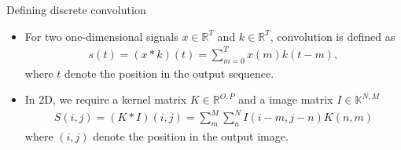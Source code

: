 \documentclass{beamer}
\begin{document}
		
		 \begin{frame}{Defining discrete convolution}
		\begin{itemize}
			\item For two one-dimensional signals $x \in \mathbb{R}^T$
        and $k \in \mathbb{R}^T$, convolution is defined as
        \begin{align}
            s(t) = (x * k)(t) = \sum_{m=0}^{T} x(m)k(t - m),
        \end{align}
				where $t$ denote the position in the output sequence. %
        \item In 2D, we require a kernel matrix $K \in \mathbb{R}^{O,P}$ and a image matrix
        $I \in \mathbb{K}^{N,M}$
        \begin{align}
            S(i,j) = (K * I)(i,j) = \sum_m^M \sum_n^N I(i-m, j-n)K(n,m)
        \end{align}
				where $(i,j)$ denote the position in the output image.
				\end{itemize}
    \end{frame}
\end{document}
